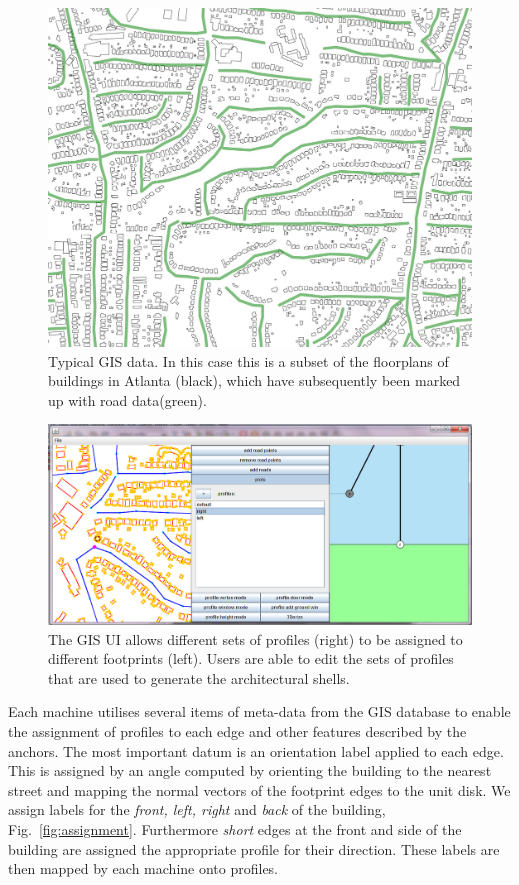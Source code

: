 \begin{figure}
  \centering
  \includegraphics[width=0.6\columnwidth]{atlantis_input_data.png}
  \caption[GIS evaluation input data]{\label{fig:gis}Typical GIS data. In this case this is a subset of the floorplans of buildings in Atlanta (black), which have subsequently been marked up with road data(green).}
\end{figure}


\begin{figure}
  \centering
  \includegraphics[width=0.8\columnwidth]{large_scale.png}
  \caption[The GIS UI for large scale profile assignment]{\label{fig:large_scale}The GIS UI allows different sets of profiles (right) to be assigned to different footprints (left). Users are able to edit the sets of profiles that are used to generate the architectural shells.}
\end{figure}

Each machine utilises several items of meta-data from the GIS database to enable the assignment of profiles to each edge and other features described by the anchors. The most important datum is an orientation label applied to each edge. This is assigned by an angle computed by orienting the building to the nearest street and mapping the normal vectors of the footprint edges to the unit disk. We assign labels for the \emph{front, left, right} and \emph{back} of the building, Fig.~\ref{fig:assignment}. Furthermore \emph{short} edges at the front and side of the building are assigned the appropriate profile for their direction. These labels are then mapped by each machine onto profiles.


